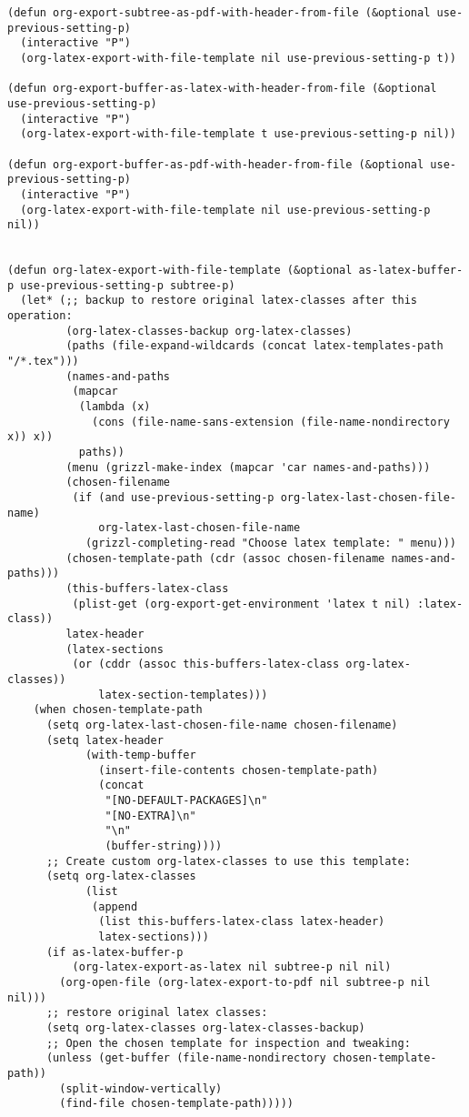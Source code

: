 \documentclass{article}
\begin{document}
\begin{enumerate}
\begin{enumerate}
\begin{verbatim}
(defun org-export-subtree-as-pdf-with-header-from-file (&optional use-previous-setting-p)
  (interactive "P")
  (org-latex-export-with-file-template nil use-previous-setting-p t))

(defun org-export-buffer-as-latex-with-header-from-file (&optional use-previous-setting-p)
  (interactive "P")
  (org-latex-export-with-file-template t use-previous-setting-p nil))

(defun org-export-buffer-as-pdf-with-header-from-file (&optional use-previous-setting-p)
  (interactive "P")
  (org-latex-export-with-file-template nil use-previous-setting-p nil))


(defun org-latex-export-with-file-template (&optional as-latex-buffer-p use-previous-setting-p subtree-p)
  (let* (;; backup to restore original latex-classes after this operation:
         (org-latex-classes-backup org-latex-classes)
         (paths (file-expand-wildcards (concat latex-templates-path "/*.tex")))
         (names-and-paths
          (mapcar
           (lambda (x)
             (cons (file-name-sans-extension (file-name-nondirectory x)) x))
           paths))
         (menu (grizzl-make-index (mapcar 'car names-and-paths)))
         (chosen-filename
          (if (and use-previous-setting-p org-latex-last-chosen-file-name)
              org-latex-last-chosen-file-name
            (grizzl-completing-read "Choose latex template: " menu)))
         (chosen-template-path (cdr (assoc chosen-filename names-and-paths)))
         (this-buffers-latex-class
          (plist-get (org-export-get-environment 'latex t nil) :latex-class))
         latex-header
         (latex-sections
          (or (cddr (assoc this-buffers-latex-class org-latex-classes))
              latex-section-templates)))
    (when chosen-template-path
      (setq org-latex-last-chosen-file-name chosen-filename)
      (setq latex-header
            (with-temp-buffer
              (insert-file-contents chosen-template-path)
              (concat
               "[NO-DEFAULT-PACKAGES]\n"
               "[NO-EXTRA]\n"
               "\n"
               (buffer-string))))
      ;; Create custom org-latex-classes to use this template:
      (setq org-latex-classes
            (list
             (append
              (list this-buffers-latex-class latex-header)
              latex-sections)))
      (if as-latex-buffer-p
          (org-latex-export-as-latex nil subtree-p nil nil)
        (org-open-file (org-latex-export-to-pdf nil subtree-p nil nil)))
      ;; restore original latex classes:
      (setq org-latex-classes org-latex-classes-backup)
      ;; Open the chosen template for inspection and tweaking:
      (unless (get-buffer (file-name-nondirectory chosen-template-path))
        (split-window-vertically)
        (find-file chosen-template-path)))))


\end{verbatim}
\end{enumerate}
\end{enumerate}
\end{document}
